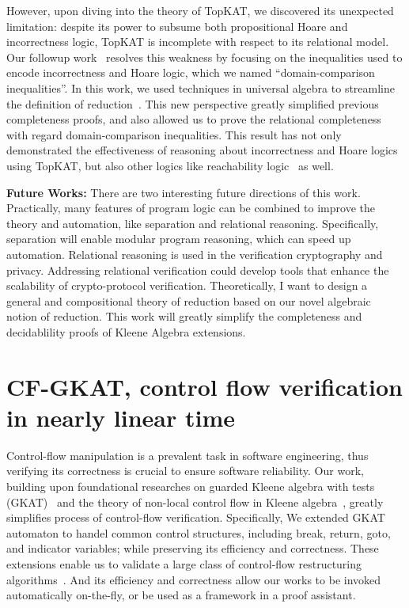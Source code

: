 \documentclass[11pt,a4paper,sans]{moderncv} %
\begin{document}
However, upon diving into the theory of TopKAT, we discovered its unexpected limitation: despite its power to subsume both propositional Hoare and incorrectness logic, TopKAT is incomplete with respect to its relational model. 
Our followup work~\cite{zhang_DomainReasoningTopKAT_2024} resolves this weakness by focusing on the inequalities used to encode incorrectness and Hoare logic, which we named ``domain-comparison inequalities''. 
In this work, we used techniques in universal algebra to streamline the definition of reduction~\cite{pous_ToolsCompletenessKleene_2021,kozen_KleeneAlgebraTests_1997c}.
This new perspective greatly simplified previous completeness proofs, and also allowed us to prove the relational completeness with regard domain-comparison inequalities. 
This result has not only demonstrated the effectiveness of reasoning about incorrectness and Hoare logics using TopKAT, but also other logics like reachability logic~\cite{naus_ReachabilityLogicLowLevel_2022a} as well.

\textbf{Future Works:}
There are two interesting future directions of this work.
Practically, many features of program logic can be combined to improve the theory and automation, like separation and relational reasoning. 
Specifically, separation will enable modular program reasoning, which can speed up automation. 
Relational reasoning is used in the verification cryptography and privacy. 
Addressing relational verification could develop tools that enhance the scalability of crypto-protocol verification. 
Theoretically, I want to design a general and compositional theory of reduction based on our novel algebraic notion of reduction. 
This work will greatly simplify the completeness and decidablility proofs of Kleene Algebra extensions. 

\section{CF-GKAT, control flow verification in nearly linear time}

Control-flow manipulation is a prevalent task in software engineering, thus verifying its correctness is crucial to ensure software reliability.
Our work, building upon foundational researches on guarded Kleene algebra with tests (GKAT)~\cite{smolka_GuardedKleeneAlgebra_2020} and the theory of non-local control flow in Kleene algebra~\cite{kozen_NonlocalFlowControl_2008a}, greatly simplifies process of control-flow verification.
Specifically, We extended GKAT automaton to handel common control structures, including break, return, goto, and indicator variables; while preserving its efficiency and correctness.
These extensions enable us to validate a large class of control-flow restructuring algorithms~\cite{yakdan_NoMoreGotos_2015,basque_AhoySAILRThere_,erosa_TamingControlFlow_1994,kozen_CertificationCompilerOptimizations_2000d}.
And its efficiency and correctness allow our works to be invoked automatically on-the-fly, or be used as a framework in a proof assistant.
\end{document}
